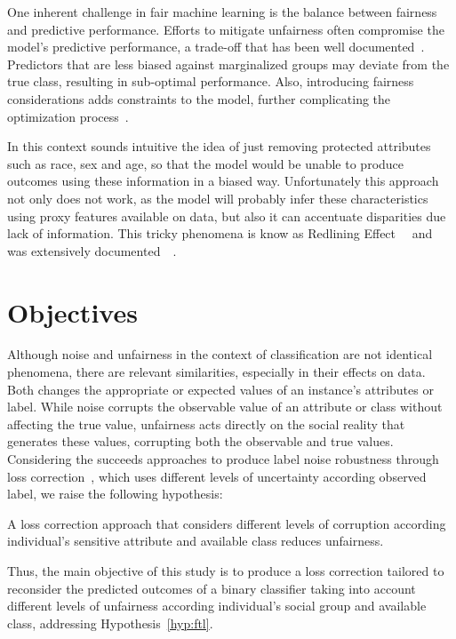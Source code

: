 One inherent challenge in fair machine learning is the balance between fairness and predictive performance. Efforts to mitigate unfairness often compromise the model's predictive performance, a trade-off that has been well documented~\citep{Mehrabi2019, caton2023}. Predictors that are less biased against marginalized groups may deviate from the true class, resulting in sub-optimal performance. Also, introducing fairness considerations adds constraints to the model, further complicating the optimization process~\citep{Zafar2017b}. 

In this context sounds intuitive the idea of just removing protected attributes such as race, sex and age, so that the model would be unable to produce outcomes using these information in a biased way. Unfortunately this approach not only does not work, as the model will probably infer these characteristics using proxy features available on data, but also it can accentuate disparities due lack of information. This tricky phenomena is know as Redlining Effect~~\citep{Pedreschi2008} and was extensively documented~~\citep{Mehrabi2019,caton2023,Hort2023}.

\section{Objectives}

Although noise and unfairness in the context of classification are not identical phenomena, there are relevant similarities, especially in their effects on data. Both changes the appropriate or expected values of an instance's attributes or label. While noise corrupts the observable value of an attribute or class without affecting the true value, unfairness acts directly on the social reality that generates these values, corrupting both the observable and true values. Considering the succeeds approaches to produce label noise robustness through loss correction~\citep{Patrini2017}, which uses different levels of uncertainty according observed label, we raise the following hypothesis:

\begin{hypothesis}\label{hyp:ftl}
A loss correction approach that considers different levels of corruption according individual's sensitive attribute and available class reduces unfairness. 
\end{hypothesis}

Thus, the main objective of this study is to produce a loss correction tailored to reconsider the predicted outcomes of a binary classifier taking into account different levels of unfairness according individual's social group and available class, addressing Hypothesis~\ref{hyp:ftl}.


